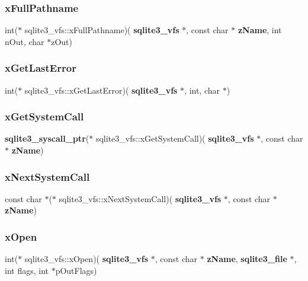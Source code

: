 \mbox{\label{structsqlite3__vfs_a02fafc56d26adab5f236df6493a8bd55}} 
\subsubsection{xFullPathname}
{\footnotesize\ttfamily int($\ast$ sqlite3\+\_\+vfs\+::x\+Full\+Pathname)(\textbf{ sqlite3\+\_\+vfs} $\ast$, const char $\ast$\textbf{ z\+Name}, int n\+Out, char $\ast$z\+Out)}

\mbox{\label{structsqlite3__vfs_a4994110c79d082f7770ce553d507748f}} 
\subsubsection{xGetLastError}
{\footnotesize\ttfamily int($\ast$ sqlite3\+\_\+vfs\+::x\+Get\+Last\+Error)(\textbf{ sqlite3\+\_\+vfs} $\ast$, int, char $\ast$)}

\mbox{\label{structsqlite3__vfs_a604384e58c645e06b6db38d8a45e1103}} 
\subsubsection{xGetSystemCall}
{\footnotesize\ttfamily \textbf{ sqlite3\+\_\+syscall\+\_\+ptr}($\ast$ sqlite3\+\_\+vfs\+::x\+Get\+System\+Call)(\textbf{ sqlite3\+\_\+vfs} $\ast$, const char $\ast$\textbf{ z\+Name})}

\mbox{\label{structsqlite3__vfs_ac2930d34749977f39b1bbc27dc1de2b2}} 
\subsubsection{xNextSystemCall}
{\footnotesize\ttfamily const char $\ast$($\ast$ sqlite3\+\_\+vfs\+::x\+Next\+System\+Call)(\textbf{ sqlite3\+\_\+vfs} $\ast$, const char $\ast$\textbf{ z\+Name})}

\mbox{\label{structsqlite3__vfs_a5f35d5528d8fdf1d26e1e206879afbe1}} 
\subsubsection{xOpen}
{\footnotesize\ttfamily int($\ast$ sqlite3\+\_\+vfs\+::x\+Open)(\textbf{ sqlite3\+\_\+vfs} $\ast$, const char $\ast$\textbf{ z\+Name}, \textbf{ sqlite3\+\_\+file} $\ast$, int flags, int $\ast$p\+Out\+Flags)}

